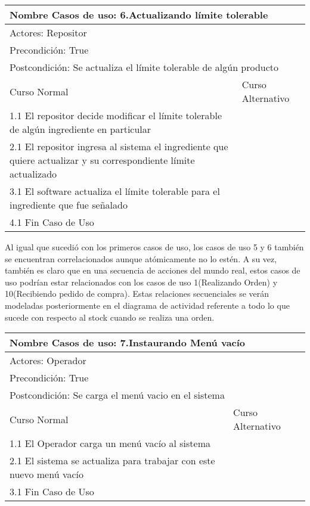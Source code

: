 \documentclass[a4paper,10pt]{article}
\begin{document}
\begin{center}
\begin{tabularx}{14cm}{|X|X|}
\hline
\multicolumn{2}{|l|}{Nombre Casos de uso: 6.Actualizando l\'imite tolerable}\\
\hline
\multicolumn{2}{|l|}{Actores: Repositor}\\
\hline
\multicolumn{2}{|l|}{Precondici\'on: True}\\
\hline
\multicolumn{2}{|l|}{Postcondici\'on: Se actualiza el l\'imite tolerable de alg\'un producto}\\
\hline
Curso Normal & Curso Alternativo\\
\hline
1.1 El repositor decide modificar el l\'imite tolerable de alg\'un ingrediente en particular & 
\\
\hline
2.1 El repositor ingresa al sistema el ingrediente que quiere actualizar y su correspondiente l\'imite actualizado & 
\\
\hline
3.1 El software actualiza el l\'imite tolerable para el ingrediente que fue se\~{n}alado &
\\
\hline
4.1 Fin Caso de Uso &
\\
\hline
\end{tabularx}
\end{center}


\bigskip
Al igual que sucedi\'o con los primeros casos de uso, los casos de uso 5 y 6 tambi\'en se encuentran correlacionados aunque at\'omicamente no lo est\'en.
A su vez, tambi\'en es claro que en una secuencia de acciones del mundo real, estos casos de uso podr\'ian estar relacionados con los casos
de uso 1(Realizando Orden) y 10(Recibiendo pedido de compra). Estas relaciones secuenciales se ver\'an modeladas posteriormente en el diagrama de actividad
referente a todo lo que sucede con respecto al stock cuando se realiza una orden.

\bigskip


\begin{center}
\begin{tabularx}{14cm}{|X|X|}
\hline
\multicolumn{2}{|l|}{Nombre Casos de uso: 7.Instaurando Men\'u vac\'io}\\
\hline
\multicolumn{2}{|l|}{Actores: Operador}\\
\hline
\multicolumn{2}{|l|}{Precondici\'on: True}\\
\hline
\multicolumn{2}{|l|}{Postcondici\'on: Se carga el men\'u vacio en el sistema}\\
\hline
Curso Normal & Curso Alternativo\\
\hline
1.1 El Operador carga un men\'u vac\'io al sistema & 
\\
\hline
2.1 El sistema se actualiza para trabajar con este nuevo men\'u vac\'io & 
\\
\hline
3.1 Fin Caso de Uso &
\\
\hline
\end{tabularx}
\end{center}
\end{document}
